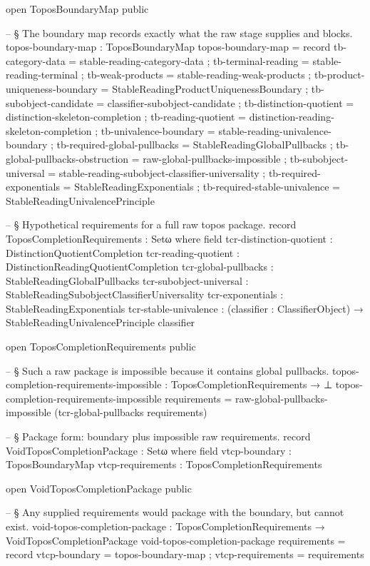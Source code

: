 \documentclass[11pt]{article}
\begin{document}
\begin{code}
open ToposBoundaryMap public

-- § The boundary map records exactly what the raw stage supplies and blocks.
topos-boundary-map : ToposBoundaryMap
topos-boundary-map = record
  { tb-category-data                 = stable-reading-category-data
  ; tb-terminal-reading              = stable-reading-terminal
  ; tb-weak-products                 = stable-reading-weak-products
  ; tb-product-uniqueness-boundary   = StableReadingProductUniquenessBoundary
  ; tb-subobject-candidate           = classifier-subobject-candidate
  ; tb-distinction-quotient          = distinction-skeleton-completion
  ; tb-reading-quotient              = distinction-reading-skeleton-completion
  ; tb-univalence-boundary           = stable-reading-univalence-boundary
  ; tb-required-global-pullbacks     = StableReadingGlobalPullbacks
  ; tb-global-pullbacks-obstruction  = raw-global-pullbacks-impossible
  ; tb-subobject-universal           = stable-reading-subobject-classifier-universality
  ; tb-required-exponentials         = StableReadingExponentials
  ; tb-required-stable-univalence    = StableReadingUnivalencePrinciple
  }

-- § Hypothetical requirements for a full raw topos package.
record ToposCompletionRequirements : Setω where
  field
    tcr-distinction-quotient : DistinctionQuotientCompletion
    tcr-reading-quotient     : DistinctionReadingQuotientCompletion
    tcr-global-pullbacks     : StableReadingGlobalPullbacks
    tcr-subobject-universal  : StableReadingSubobjectClassifierUniversality
    tcr-exponentials         : StableReadingExponentials
    tcr-stable-univalence    : (classifier : ClassifierObject) →
                               StableReadingUnivalencePrinciple classifier

open ToposCompletionRequirements public

-- § Such a raw package is impossible because it contains global pullbacks.
topos-completion-requirements-impossible :
  ToposCompletionRequirements → ⊥
topos-completion-requirements-impossible requirements =
  raw-global-pullbacks-impossible (tcr-global-pullbacks requirements)

-- § Package form: boundary plus impossible raw requirements.
record VoidToposCompletionPackage : Setω where
  field
    vtcp-boundary     : ToposBoundaryMap
    vtcp-requirements : ToposCompletionRequirements

open VoidToposCompletionPackage public

-- § Any supplied requirements would package with the boundary, but cannot exist.
void-topos-completion-package :
  ToposCompletionRequirements → VoidToposCompletionPackage
void-topos-completion-package requirements = record
  { vtcp-boundary     = topos-boundary-map
  ; vtcp-requirements = requirements
  }
\end{code}
\end{document}
